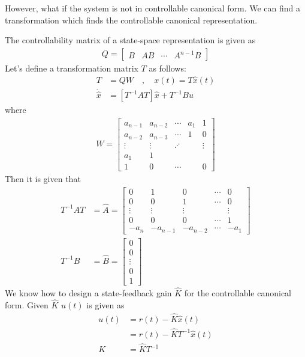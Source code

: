 \documentclass[twoside]{article}
\begin{document}
However, what if the system is not in controllable canonical form. We can
find a transformation which finds the controllable canonical
representation. 

The controllability matrix of a state-space representation is given as
%
\begin{align*}
  Q = \left[ \begin{array}{c|c|c|c} B & A B & \cdots & A^{n-1} B\end{array} \right]
\end{align*}
%
Let's define a transformation matrix $T$ as follows:
%
\begin{align*}
  T &= Q W \quad , \quad x(t) = T \hat{x}(t)
\\
 \dot{\hat{x}} &= \left[ T^{-1} A T \right] \hat{x} + T^{-1} B u
\end{align*}
%
where
%
\begin{align*}
  W = \left[ \begin{array}{ccccc} a_{n-1} & a_{n-2} & \cdots & a_1 & 1
               \\ 
a_{n-2} & a_{n-3} & \cdots & 1 & 0
\\ \vdots & \vdots & \iddots & & \vdots
\\ a_1 & 1 &  & & 
    \\ 1 & 0 & \cdots &  & 0 \end{array} \right] 
\end{align*}
%
Then it is given that
%
\begin{align*}
  T^{-1} A T &= \hat{A} =  \left[ \begin{array}{ccccc} 0 & 1 & 0 & \cdots & 0 \\ 0 & 0 & 1 &
                                                                      \cdots & 0
\\ \vdots & \vdots & \vdots & & \vdots
\\ 0 & 0 & 0 & \cdots & 1
    \\ -a_n & -a_{n-1} & -a_{n-2} & \cdots & -a_1 \end{array} \right]
\\
  T^{-1} B &= \hat{B} = \left[ \begin{array}{c} 0\\ 0 \\ \vdots \\ 0
    \\ 1 \end{array} \right]
\end{align*}
%
We know how to design a
state-feedback gain $\hat{K}$ for the controllable
canonical form. Given $\hat{K}$ 
$u(t)$ is given as
%
\begin{align*}
  u(t) &= r(t) -\hat{K} \hat{x}(t)
\\ 
&= r(t) - \hat{K} T^{-1} \hat{x}(t)
\\
K &= \hat{K} T^{-1}
\end{align*}
\end{document}
